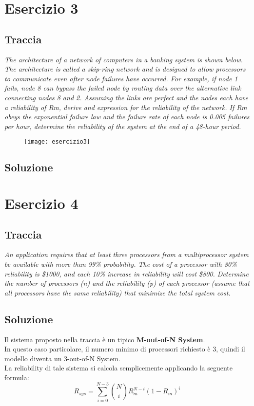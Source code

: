 \clearpage

\section{Esercizio 3}
\subsection{Traccia}
\textit{The architecture of a network of computers in a banking system is shown
below. The architecture is called a skip-ring network and is designed to allow
processors to communicate even after node failures have occurred. For example,
if node 1 fails, node 8 can bypass the failed node by routing data over the
alternative link connecting nodes 8 and 2. Assuming the links are perfect and
the nodes each have a reliability of Rm, derive and expression for the reliability
of the network. If Rm obeys the exponential failure law and the failure rate of
each node is 0.005 failures per hour, determine the reliability of the system
at the end of a 48-hour period.}
\begin{figure}[!htbp]
  \centering
  \texttt{[image: esercizio3]}
\end{figure}

\clearpage
\subsection{Soluzione}

\clearpage
\section{Esercizio 4}
\subsection{Traccia}
\textit{An application requires that at least three processors from a multiprocessor
system be available with more than 99\% probability. The cost of a processor with
80\% reliability is \$1000, and each 10\% increase in reliability will cost \$800.
Determine the number of processors (n) and the reliability (p) of each processor
(assume that all processors have the same reliability) that minimize the total
system cost.}

\clearpage
\subsection{Soluzione}
Il sistema proposto nella traccia è un tipico \textbf{M-out-of-N System}.\\
In questo caso particolare, il numero minimo di processori richiesto è 3, quindi
il modello diventa un 3-out-of-N System.\\
La reliability di tale sistema si calcola semplicemente applicando la seguente
formula:
$$R_{sys} = \sum_{i=0}^{N-3} \binom{N}{i} R_m^{N-i}(1-R_m)^i$$
\vspace{0.4cm}

